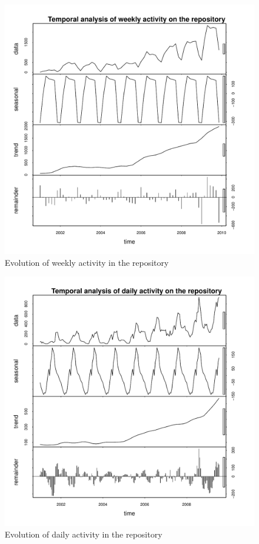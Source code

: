 \begin{figure}[!hptb]
\includegraphics[width=400pt]{images/commitsByDay.pdf}
\caption{Evolution of weekly activity in the repository}
\label{commits:evo:weekly}
\end{figure}

\begin{figure}[!hptb]
\includegraphics[width=400pt]{images/commitsByHour.pdf}
\caption{Evolution of daily activity in the repository}
\label{commits:evo:daily}
\end{figure}

